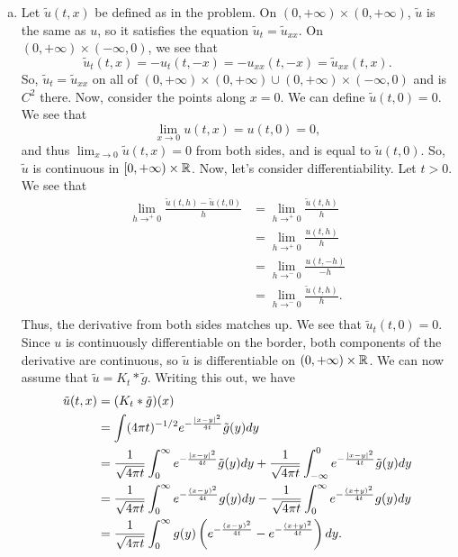 \documentclass{article}
\begin{document}
\newpage
{} 
 \tri
\hop 
\solution
\newcommand{\tu}{\tilde{u}}
\begin{enumerate}[(a)]
    \item Let $\tilde{u}(t,x)$ be defined as in the problem. On $(0, +\infty) \times (0, +\infty)$, $\tilde{u}$ is the same as $u$, so it satisfies the equation $\tu_t = \tu_{xx}$. On $(0, +\infty) \times (-\infty, 0)$, we see that 
    \[\tu_t(t,x) = -u_t(t, -x) = -u_{xx}(t, -x) = \tu_{xx}(t,x).\]
    So, $\tu_t = \tu_{xx}$ on all of  $(0, +\infty) \times (0, +\infty)  \cup (0, +\infty) \times (-\infty, 0)$ and is $C^2$ there. Now, consider the points along $x=0$. We can define $\tu(t,0)= 0$. We see that 
    \[\lim_{x \to 0} u(t,x) = u(t,0) = 0,\]
    and thus $\lim_{x \to 0} \tu(t,x) = 0$ from both sides, and is equal to $\tu(t,0)$. So, $\tu$ is continuous in $[0,+\infty)\times \mathbb{R}$. 
    \hop 
    Now, let's consider differentiability. Let $t > 0$. We see that 
    \begin{align*}
        \lim_{h\to^+ 0} \frac{\tu(t,h)- \tu(t,0)}{h} &=  \lim_{h\to^+ 0} \frac{\tu(t,h)}{h} \\
        &= \lim_{h\to^+ 0} \frac{u(t,h)}{h}\\
        &= \lim_{h\to^- 0} \frac{u(t,-h)}{-h}\\
        &= \lim_{h\to^- 0} \frac{\tu(t,h)}{h}.\\
    \end{align*}
    Thus, the derivative from both sides matches up. We see that $\tu_t(t,0) = 0$. Since $u$ is continuously differentiable on the border, both components of the derivative are continuous, so $\tu$ is differentiable on $(0, +\infty) \times \mathbb{R}$. 
    \hop 
    We can now assume that $\tu = K_t * \tilde{g}$. Writing this out, we have 
    \begin{align*}
        \tu(t,x) &= (K_t * \tilde{g})(x)\\
        &= \int(4\pi t)^{-1/2} e^{-\frac{|x-y|^2}{4t}} \tilde{g}(y)dy\\
        &=  \frac{1}{\sqrt{4\pi t}}\int_{0}^\infty  e^{-\frac{|x-y|^2}{4t}} \tilde{g}(y)dy+ \frac{1}{\sqrt{4\pi t}}\int_{-\infty}^0  e^{-\frac{|x-y|^2}{4t}} \tilde{g}(y)dy\\
        &=  \frac{1}{\sqrt{4\pi t}}\int_{0}^\infty  e^{-\frac{(x-y)^2}{4t}} g(y)dy- \frac{1}{\sqrt{4\pi t}}\int_{0}^\infty  e^{-\frac{(x+y)^2}{4t}} g(y)dy\\
        &=  \frac{1}{\sqrt{4\pi t}}\int_{0}^\infty  g(y)\del{ e^{-\frac{(x-y)^2}{4t}} - e^{-\frac{(x+y)^2}{4t}}}dy.\\

\end{align*}
\end{enumerate}
\end{document}
